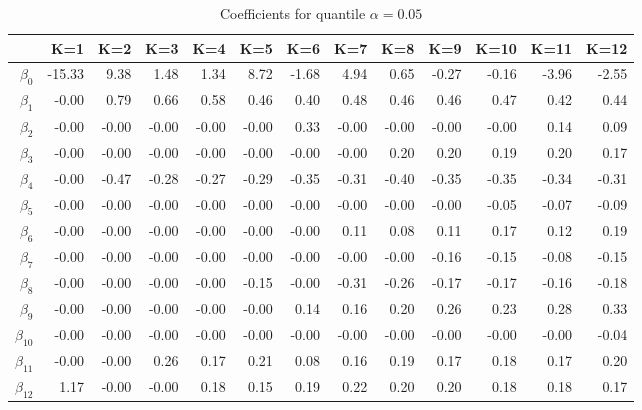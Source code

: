 \begin{table}[ht]
\centering
\begin{tabular}{rrrrrrrrrrrrr}
  \hline
 & K=1 & K=2 & K=3 & K=4 & K=5 & K=6 & K=7 & K=8 & K=9 & K=10 & K=11 & K=12 \\ 
  \hline
$\beta_{0}$ & -15.33 & 9.38 & 1.48 & 1.34 & 8.72 & -1.68 & 4.94 & 0.65 & -0.27 & -0.16 & -3.96 & -2.55 \\ 
  $\beta_{1}$ & -0.00 & 0.79 & 0.66 & 0.58 & 0.46 & 0.40 & 0.48 & 0.46 & 0.46 & 0.47 & 0.42 & 0.44 \\ 
  $\beta_{2}$ & -0.00 & -0.00 & -0.00 & -0.00 & -0.00 & 0.33 & -0.00 & -0.00 & -0.00 & -0.00 & 0.14 & 0.09 \\ 
  $\beta_{3}$ & -0.00 & -0.00 & -0.00 & -0.00 & -0.00 & -0.00 & -0.00 & 0.20 & 0.20 & 0.19 & 0.20 & 0.17 \\ 
  $\beta_{4}$ & -0.00 & -0.47 & -0.28 & -0.27 & -0.29 & -0.35 & -0.31 & -0.40 & -0.35 & -0.35 & -0.34 & -0.31 \\ 
  $\beta_{5}$ & -0.00 & -0.00 & -0.00 & -0.00 & -0.00 & -0.00 & -0.00 & -0.00 & -0.00 & -0.05 & -0.07 & -0.09 \\ 
  $\beta_{6}$ & -0.00 & -0.00 & -0.00 & -0.00 & -0.00 & -0.00 & 0.11 & 0.08 & 0.11 & 0.17 & 0.12 & 0.19 \\ 
  $\beta_{7}$ & -0.00 & -0.00 & -0.00 & -0.00 & -0.00 & -0.00 & -0.00 & -0.00 & -0.16 & -0.15 & -0.08 & -0.15 \\ 
  $\beta_{8}$ & -0.00 & -0.00 & -0.00 & -0.00 & -0.15 & -0.00 & -0.31 & -0.26 & -0.17 & -0.17 & -0.16 & -0.18 \\ 
  $\beta_{9}$ & -0.00 & -0.00 & -0.00 & -0.00 & -0.00 & 0.14 & 0.16 & 0.20 & 0.26 & 0.23 & 0.28 & 0.33 \\ 
  $\beta_{10}$ & -0.00 & -0.00 & -0.00 & -0.00 & -0.00 & -0.00 & -0.00 & -0.00 & -0.00 & -0.00 & -0.00 & -0.04 \\ 
  $\beta_{11}$ & -0.00 & -0.00 & 0.26 & 0.17 & 0.21 & 0.08 & 0.16 & 0.19 & 0.17 & 0.18 & 0.17 & 0.20 \\ 
  $\beta_{12}$ & 1.17 & -0.00 & -0.00 & 0.18 & 0.15 & 0.19 & 0.22 & 0.20 & 0.20 & 0.18 & 0.18 & 0.17 \\ 
   \hline
\end{tabular}
\caption{Coefficients for quantile $\alpha = 0.05$}
\end{table}
